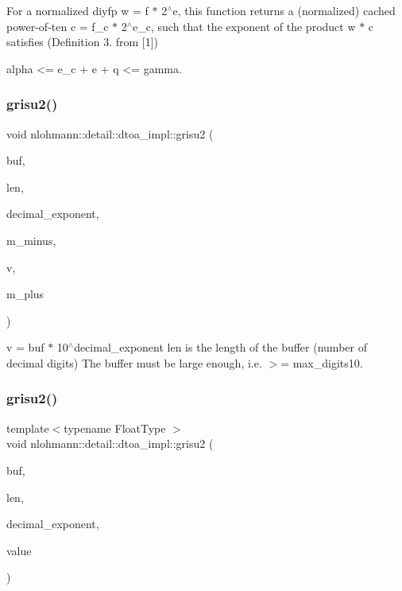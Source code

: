 For a normalized diyfp w = f $\ast$ 2$^\wedge$e, this function returns a (normalized) cached power-\/of-\/ten c = f\+\_\+c $\ast$ 2$^\wedge$e\+\_\+c, such that the exponent of the product w $\ast$ c satisfies (Definition 3. from \mbox{[}1\mbox{]}) \begin{DoxyVerb} alpha <= e_c + e + q <= gamma.
\end{DoxyVerb}
 \mbox{\label{namespacenlohmann_1_1detail_1_1dtoa__impl_a05b681dcb8569b9784c6dccfadb01633}} 
\subsubsection{\texorpdfstring{grisu2()}{grisu2()}\hspace{0.1cm}{\footnotesize\ttfamily [1/2]}}
{\footnotesize\ttfamily void nlohmann\+::detail\+::dtoa\+\_\+impl\+::grisu2 (\begin{DoxyParamCaption}\item[{char $\ast$}]{buf,  }\item[{int \&}]{len,  }\item[{int \&}]{decimal\+\_\+exponent,  }\item[{\mbox{\hyperlink{structnlohmann_1_1detail_1_1dtoa__impl_1_1diyfp}{diyfp}}}]{m\+\_\+minus,  }\item[{\mbox{\hyperlink{structnlohmann_1_1detail_1_1dtoa__impl_1_1diyfp}{diyfp}}}]{v,  }\item[{\mbox{\hyperlink{structnlohmann_1_1detail_1_1dtoa__impl_1_1diyfp}{diyfp}}}]{m\+\_\+plus }\end{DoxyParamCaption})\hspace{0.3cm}{\ttfamily [inline]}}

v = buf $\ast$ 10$^\wedge$decimal\+\_\+exponent len is the length of the buffer (number of decimal digits) The buffer must be large enough, i.\+e. $>$= max\+\_\+digits10. \mbox{\label{namespacenlohmann_1_1detail_1_1dtoa__impl_aab7a9670a4f4704a5d0347ad7588576b}} 
\subsubsection{\texorpdfstring{grisu2()}{grisu2()}\hspace{0.1cm}{\footnotesize\ttfamily [2/2]}}
{\footnotesize\ttfamily template$<$typename Float\+Type $>$ \\
void nlohmann\+::detail\+::dtoa\+\_\+impl\+::grisu2 (\begin{DoxyParamCaption}\item[{char $\ast$}]{buf,  }\item[{int \&}]{len,  }\item[{int \&}]{decimal\+\_\+exponent,  }\item[{Float\+Type}]{value }\end{DoxyParamCaption})}

